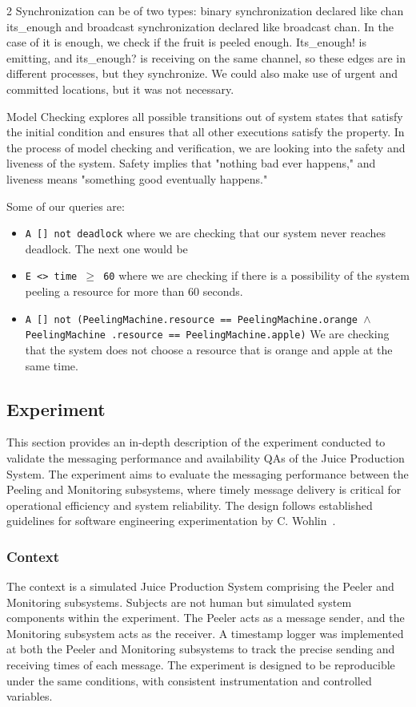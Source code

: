 \documentclass{article}
\begin{document}
\begin{multicols}{2}
Synchronization can be of two types: binary synchronization declared like chan its\_enough and broadcast synchronization declared like broadcast chan. In the case of it is enough, we check if the fruit is peeled enough. Its\_enough! is emitting, and its\_enough? is receiving on the same channel, so these edges are in different processes, but they synchronize. We could also make use of urgent and committed locations, but it was not necessary. 

Model Checking explores all possible transitions out of system states that satisfy the initial condition and ensures that all other executions satisfy the property. In the process of model checking and verification, we are looking into the safety and liveness of the system. Safety implies that "nothing bad ever happens," and liveness means "something good eventually happens." 

Some of our queries are: 
\begin{itemize}
\item \texttt{A [] not deadlock}
where we are checking that our system never reaches deadlock. The next one would be  

\item \texttt{E <> time $\geq$ 60} 
where we are checking if there is a possibility of the system peeling a resource for more than 60 seconds.  

\item \texttt{A [] not (PeelingMachine.resource == PeelingMachine.orange $\land$ PeelingMachine
.resource == PeelingMachine.apple)}
We are checking that the system does not choose a resource that is orange and apple at the same time.  
\end{itemize}

\subsection{Experiment}

\color{black}
This section provides an in-depth description of the experiment conducted to validate the messaging performance and availability QAs of the Juice Production System. The experiment aims to evaluate the messaging performance between the Peeling and Monitoring subsystems, where timely message delivery is critical for operational efficiency and system reliability. The design follows established guidelines for software engineering experimentation by C. Wohlin~\cite{b14}.

\subsubsection{Context}
The context is a simulated Juice Production System comprising the Peeler and Monitoring subsystems. Subjects are not human but simulated system components within the experiment. The Peeler acts as a message sender, and the Monitoring subsystem acts as the receiver. A timestamp logger was implemented at both the Peeler and Monitoring subsystems to track the precise sending and receiving times of each message. The experiment is designed to be reproducible under the same conditions, with consistent instrumentation and controlled variables.


\end{multicols}
\end{document}
